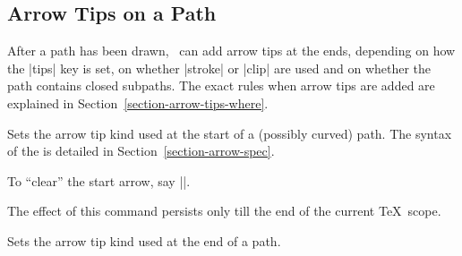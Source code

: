 \subsection{Arrow Tips on a Path}
\label{section-tips}

After a path has been drawn, \pgfname\ can add arrow tips at the ends,
depending on how the |tips| key is set, on whether |stroke| or |clip| are used
and on whether the path contains closed subpaths. The exact rules when arrow
tips are added are explained in Section~\ref{section-arrow-tips-where}.

\begin{command}{\pgfsetarrowsstart{}}
    Sets the arrow tip kind used at the start of a (possibly curved) path. The
    syntax of the  is detailed in
    Section~\ref{section-arrow-spec}.

    To ``clear'' the start arrow, say |\pgfsetarrowsstart{}|.
\begin{codeexample}[]
\begin{pgfpicture}
  \pgfpathmoveto{\pgfpointorigin}
  \pgfpathlineto{\pgfpoint{1cm}{0cm}}
  \pgfpathmoveto{\pgfpoint{0cm}{2mm}}
  \pgfpathlineto{\pgfpoint{1cm}{2mm}}
\end{pgfpicture}
\end{codeexample}

    The effect of this command persists only till the end of the current \TeX\
    scope.
\end{command}

\begin{command}{\pgfsetarrowsend{}}
    Sets the arrow tip kind used at the end of a path.
\begin{codeexample}[]
\begin{pgfpicture}
  \pgfpathmoveto{\pgfpointorigin}
  \pgfpathlineto{\pgfpoint{1cm}{0cm}}
\end{pgfpicture}
\end{codeexample}
\end{command}

